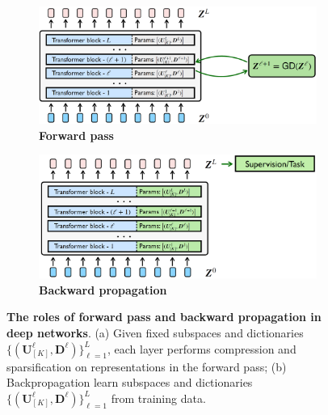\documentclass[../../book-main.tex]{subfiles}
\begin{document}
\begin{figure}[t]
    \begin{subfigure}[t]{0.48\textwidth}
        \centering
        \includegraphics[width=\textwidth]{figs_chap4/forward.png}
        \caption{\bf Forward pass}
    \end{subfigure}
    \hfill
    \begin{subfigure}[t]{0.48\textwidth}
        \centering
        \includegraphics[width=\textwidth]{figs_chap4/backward.png}
        \caption{\bf Backward propagation}
    \end{subfigure}
    \caption{\small {\bf The roles of forward pass and backward propagation in deep networks}. (a) Given fixed subspaces and dictionaries $\{(\bm U_{[K]}^{\ell}, \bm D^{\ell})\}_{\ell=1}^L$, each layer performs compression and sparsification on representations in the forward pass; (b) Backpropagation learn subspaces and dictionaries $\{(\bm U_{[K]}^{\ell}, \bm D^{\ell})\}_{\ell=1}^L$ from training data. }
    \label{fig:forward-backward}
\end{figure}
\end{document}
